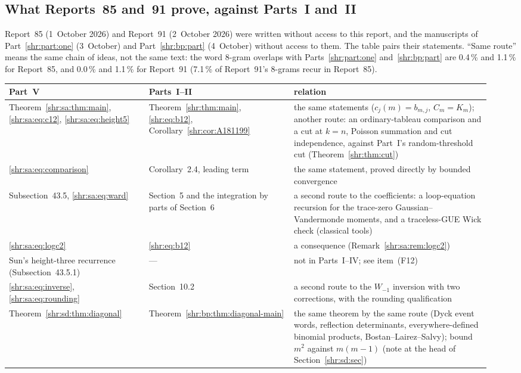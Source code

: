 \documentclass[11pt,letterpaper]{article}
\numberwithin{equation}{section}
\theoremstyle{definition}
\newcommand{\1}{\mathbf 1}
\begin{document}
\subsection{What Reports~85 and~91 prove, against Parts~I and~II}
Report~85 (1~October 2026) and Report~91 (2~October 2026) were written
without access to this report, and the manuscripts of Part~\ref{shr:part:one}
(3~October) and Part~\ref{shr:bp:part} (4~October) without access to them.
The table pairs their statements. ``Same route'' means the same chain of
ideas, not the same text: the word 8-gram overlaps with
Parts~\ref{shr:part:one} and~\ref{shr:bp:part} are 0.4\,\% and 1.1\,\%
for Report~85, and 0.0\,\% and 1.1\,\% for Report~91 (7.1\,\% of
Report~91's 8-grams recur in Report~85).
{\footnotesize
\begin{longtable}{@{}>{\raggedright\arraybackslash}p{0.27\linewidth}>{\raggedright\arraybackslash}p{0.29\linewidth}>{\raggedright\arraybackslash}p{0.38\linewidth}@{}}
\toprule
Part~V & Parts~I--II & relation\\
\midrule\endhead
Theorem~\ref{shr:sa:thm:main}, \eqref{shr:sa:eq:c12}, \eqref{shr:sa:eq:height5} & Theorem~\ref{shr:thm:main}, \eqref{shr:eq:b12}, Corollary~\ref{shr:cor:A181199} & the same statements ($c_j(m)=b_{m,j}$, $C_m=K_m$); another route: an ordinary-tableau comparison and a cut at $k=n$, Poisson summation and cut independence, against Part~I's random-threshold cut (Theorem~\ref{shr:thm:cut})\\
\eqref{shr:sa:eq:comparison} & Corollary~2.4, leading term & the same statement, proved directly by bounded convergence\\
Subsection~43.5, \eqref{shr:sa:eq:ward} & Section~5 and the integration by parts of Section~6 & a second route to the coefficients: a loop-equation recursion for the trace-zero Gaussian--Vandermonde moments, and a traceless-GUE Wick check (classical tools)\\
\eqref{shr:sa:eq:logc2} & \eqref{shr:eq:b12} & a consequence (Remark~\ref{shr:sa:rem:logc2})\\
Sun's height-three recurrence (Subsection~43.5.1) & --- & not in Parts~I--IV; see item~(F12)\\
\eqref{shr:sa:eq:inverse}, \eqref{shr:sa:eq:rounding} & Section~10.2 & a second route to the $W_{-1}$ inversion with two corrections, with the rounding qualification\\
Theorem~\ref{shr:sd:thm:diagonal} & Theorem~\ref{shr:bp:thm:diagonal-main} & the same theorem by the same route (Dyck event words, reflection determinants, everywhere-defined binomial products, Bostan--Lairez--Salvy); bound $m^2$ against $m(m-1)$ (note at the head of Section~\ref{shr:sd:sec})\\

\end{longtable}}
\end{document}
